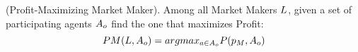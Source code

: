 \begin{definition} (Profit-Maximizing Market Maker).
\label{def:pmmm}
Among all Market Makers $L$, given a set of participating agents $A_o$ find the one that maximizes Profit:
$$ PM(L, A_o) = arg max_{a \in A_o} P(p_M, A_o)$$
\end{definition}


